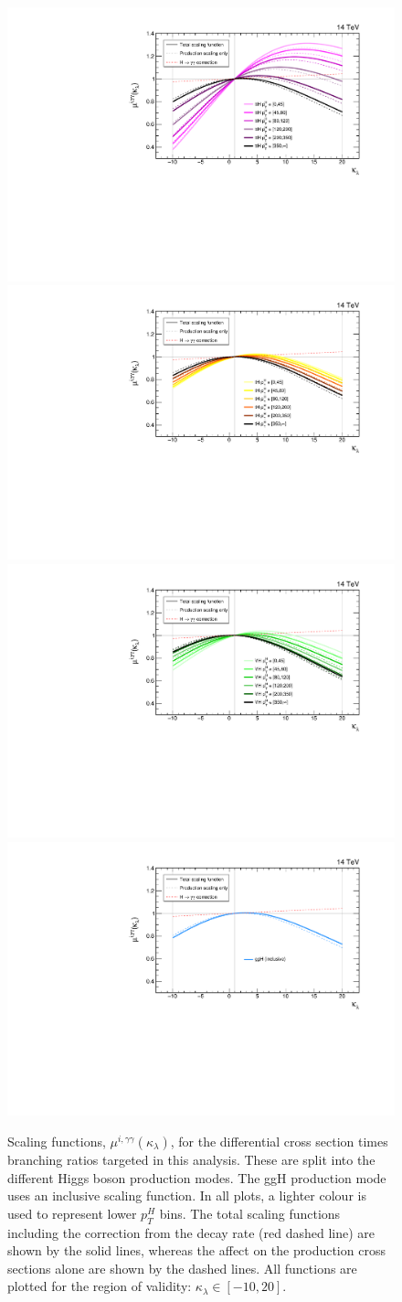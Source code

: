 \begin{figure}[htb!]
  \centering
  \includegraphics[width=.49\textwidth]{Figures/cms/trilinear/ttH.pdf}
  \includegraphics[width=.49\textwidth]{Figures/cms/trilinear/tH.pdf}
  \includegraphics[width=.49\textwidth]{Figures/cms/trilinear/VH.pdf}
  \includegraphics[width=.49\textwidth]{Figures/cms/trilinear/ggH.pdf}
  \caption[Scaling functions in terms of $\kappa_\lambda$]
  {
    Scaling functions, $\mu^{i,\gamma\gamma}(\kappa_\lambda)$, for the differential cross section times branching ratios targeted in this analysis. These are split into the different Higgs boson production modes. The ggH production mode uses an inclusive scaling function. In all plots, a lighter colour is used to represent lower $p_T^H$ bins. The total scaling functions including the correction from the \Hgg decay rate (red dashed line) are shown by the solid lines, whereas the affect on the production cross sections alone are shown by the dashed lines. All functions are plotted for the region of validity: $\kappa_\lambda \in [-10,20]$.
  }
  \label{fig:trilinear_sf}
\end{figure}

